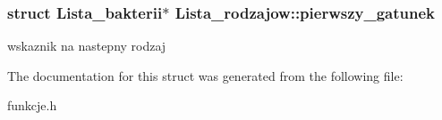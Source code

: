 \subsubsection[{\texorpdfstring{pierwszy\+\_\+gatunek}{pierwszy_gatunek}}]{\setlength{\rightskip}{0pt plus 5cm}struct {\bf Lista\+\_\+bakterii}$\ast$ Lista\+\_\+rodzajow\+::pierwszy\+\_\+gatunek}\hypertarget{structLista__rodzajow_ad5224c57306a452beed54d774fd959af}{}\label{structLista__rodzajow_ad5224c57306a452beed54d774fd959af}
wskaznik na nastepny rodzaj 

The documentation for this struct was generated from the following file\+:\begin{DoxyCompactItemize}
\item 
funkcje.\+h\end{DoxyCompactItemize}
